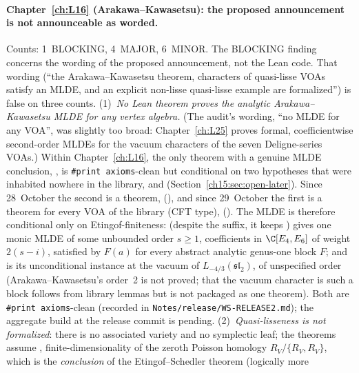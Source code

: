 \paragraph{Chapter~\ref{ch:L16} (Arakawa--Kawasetsu): the proposed announcement is not announceable as worded.} Counts:
1~BLOCKING, 4~MAJOR, 6~MINOR. The BLOCKING finding concerns the wording of the proposed announcement, not the Lean code.
That wording (``the Arakawa--Kawasetsu theorem, characters of quasi-lisse VOAs satisfy an MLDE, and an explicit
non-lisse quasi-lisse example are formalized'') is false on three counts. (1)~\emph{No Lean theorem proves the analytic Arakawa--Kawasetsu
MLDE for any vertex algebra.} (The audit's wording, ``no MLDE for any VOA'', was slightly too broad: Chapter~\ref{ch:L25}
proves formal, coefficientwise second-order MLDEs for the vacuum characters of the seven Deligne-series VOAs.) Within
Chapter~\ref{ch:L16}, the only theorem with a genuine MLDE conclusion,
, is \texttt{\#print axioms}-clean but
conditional on two hypotheses that were inhabited nowhere in the library,  and
 (Section~\ref{ch15:sec:open-later}). Since 28~October the second is a theorem,
 (), and since 29~October the first is a theorem for every
VOA of the library (CFT type),  (). The MLDE is
therefore conditional only on Etingof-finiteness:
 (despite the suffix, it keeps
) gives one monic MLDE of some unbounded order $s\ge1$, coefficients in $\C[E_4,E_6]$ of weight
$2(s-i)$, satisfied by $F(a)$ for every abstract analytic genus-one block $F$; and
 is its unconditional instance at the vacuum of
$L_{-4/3}(\mathfrak{sl}_2)$, of unspecified order (Arakawa--Kawasetsu's order~2 is not proved; that the vacuum character
is such a block follows from library lemmas but is not packaged as one theorem). Both are \texttt{\#print axioms}-clean
(recorded in \texttt{Notes/release/WS-RELEASE2.md}); the aggregate build at the release commit is pending. (2)~\emph{Quasi-lisseness is not formalized}: there is no
associated variety and no symplectic leaf; the theorems assume , finite-dimensionality of the zeroth
Poisson homology $R_V/\{R_V,R_V\}$, which is the \emph{conclusion} of the Etingof--Schedler theorem (logically more
